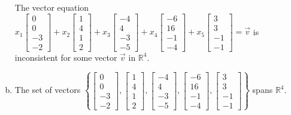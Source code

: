 \begin{exerciseAnswer}
\begin{enumerate}[(a)]
\begin{center}\begin{minipage}{0.8\textwidth}
 The vector equation \( x_{1} \left[\begin{array}{c}
0 \\
0 \\
-3 \\
-2
\end{array}\right] + x_{2} \left[\begin{array}{c}
1 \\
4 \\
1 \\
2
\end{array}\right] + x_{3} \left[\begin{array}{c}
-4 \\
4 \\
-3 \\
-5
\end{array}\right] + x_{4} \left[\begin{array}{c}
-6 \\
16 \\
-1 \\
-4
\end{array}\right] + x_{5} \left[\begin{array}{c}
3 \\
3 \\
-1 \\
-1
\end{array}\right] =\vec{v}\) is inconsistent for some vector \(\vec{v}\) in \(\mathbb{R}^4\). 
\end{minipage}\end{center}
    
\item  The set of vectors \( \left\{ \left[\begin{array}{c}
0 \\
0 \\
-3 \\
-2
\end{array}\right] , \left[\begin{array}{c}
1 \\
4 \\
1 \\
2
\end{array}\right] , \left[\begin{array}{c}
-4 \\
4 \\
-3 \\
-5
\end{array}\right] , \left[\begin{array}{c}
-6 \\
16 \\
-1 \\
-4
\end{array}\right] , \left[\begin{array}{c}
3 \\
3 \\
-1 \\
-1
\end{array}\right] \right\} \) spans \(\mathbb{R}^4\). 
\end{enumerate}
    
\end{exerciseAnswer}
    
